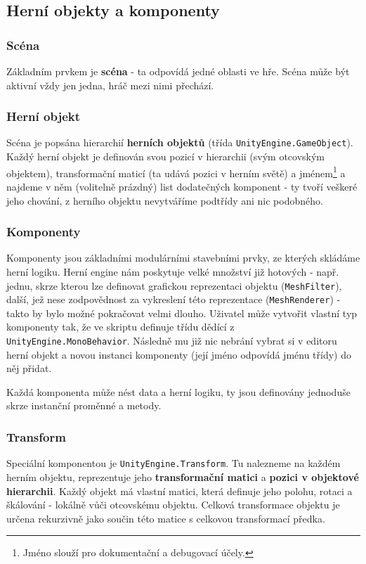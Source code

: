 \subsection{Herní objekty a komponenty}

\subsubsection*{Scéna}
Základním prvkem je \textbf{scéna} - ta odpovídá jedné oblasti ve hře. Scéna může být aktivní vždy jen jedna, hráč mezi nimi přechází.

\subsubsection*{Herní objekt}
Scéna je popsána hierarchií \textbf{herních objektů} (třída \texttt{UnityEngine.GameObject}). Každý herní objekt je definován svou pozicí v hierarchii (svým otcovským objektem), transformační maticí (ta udává pozici v herním světě) a jménem\footnote{Jméno slouží pro dokumentační a debugovací účely.} a najdeme v něm (volitelně prázdný) list dodatečných komponent - ty tvoří veškeré jeho chování, z herního objektu nevytváříme podtřídy ani nic podobného.

\subsubsection*{Komponenty}
Komponenty jsou základními modulárními stavebními prvky, ze kterých skládáme herní logiku. Herní engine nám poskytuje velké množství již hotových - např. jednu, skrze kterou lze definovat grafickou reprezentaci objektu (\texttt{MeshFilter}), další, jež nese zodpovědnost za vykreslení této reprezentace (\texttt{MeshRenderer}) - takto by bylo možné pokračovat velmi dlouho. Uživatel může vytvořit vlastní typ komponenty tak, že ve skriptu definuje třídu dědící z \texttt{UnityEngine.MonoBehavior}. Následně mu již nic nebrání vybrat si v editoru herní objekt a novou instanci komponenty (její jméno odpovídá jménu třídy) do něj přidat.

Každá komponenta může nést data a herní logiku, ty jsou definovány jednoduše skrze instanční proměnné a metody.  

\subsubsection*{Transform}

Speciální komponentou je \texttt{UnityEngine.Transform}. Tu nalezneme na každém herním objektu, reprezentuje jeho \textbf{transformační matici} a \textbf{pozici v objektové hierarchii}. Každý objekt má vlastní matici, která definuje jeho polohu, rotaci a škálování - lokálně vůči otcovskému objektu. Celková transformace objektu je určena rekurzivně jako součin této matice s celkovou transformací předka.

